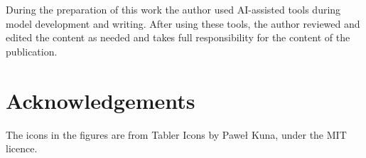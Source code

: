 During the preparation of this work the author used AI-assisted tools  during model development and writing. After using these tools, the author reviewed and edited the content as needed and takes full responsibility for the content of the publication. 

\section*{Acknowledgements}

 The icons in the figures are from Tabler Icons by Paweł Kuna, under the MIT licence.
